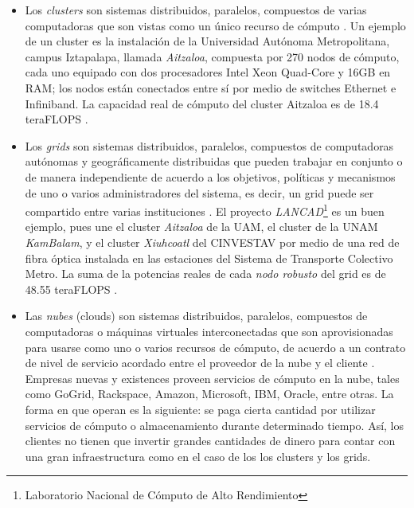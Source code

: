 \documentclass[letterpaper, 12pt]{report}
\begin{document}
\begin{itemize}
\item Los \emph{clusters} son sistemas distribuidos, paralelos, compuestos de varias computadoras que son vistas como un único recurso de cómputo \cite{buyya2009cloud}. Un ejemplo de un cluster es la instalación de la Universidad Autónoma Metropolitana, campus Iztapalapa, llamada \emph{Aitzaloa}, compuesta por 270 nodos de cómputo, cada uno equipado con dos procesadores Intel Xeon Quad-Core y 16GB en RAM; los nodos están conectados entre sí por medio de switches Ethernet e Infiniband. La capacidad real de cómputo del cluster Aitzaloa es de 18.4 teraFLOPS \cite{uamz2013tizaloa}.

\item Los \emph{grids} son sistemas distribuidos, paralelos, compuestos de computadoras autónomas y geográficamente distribuidas que pueden trabajar en conjunto o de manera independiente de acuerdo a los objetivos, políticas y mecanismos de uno o varios administradores del sistema, es decir, un grid puede ser compartido entre varias instituciones \cite{buyya2009cloud}. El proyecto \emph{LANCAD}\footnote{Laboratorio Nacional de Cómputo de Alto Rendimiento} es un buen ejemplo, pues une el cluster \emph{Aitzaloa} de la UAM, el cluster de la UNAM \emph{KamBalam}, y el cluster \emph{Xiuhcoatl} del CINVESTAV por medio de una red de fibra óptica instalada en las estaciones del Sistema de Transporte Colectivo Metro. La suma de la potencias reales de cada \emph{nodo robusto} del grid es de 48.55 teraFLOPS \cite{lancad2013xiuhcoatl}.

\item Las \emph{nubes} (clouds) son sistemas distribuidos, paralelos, compuestos de computadoras o máquinas virtuales interconectadas que son aprovisionadas para usarse como uno o varios recursos de cómputo, de acuerdo a un contrato de nivel de servicio acordado entre el proveedor de la nube y el cliente \cite{buyya2009cloud}. Empresas nuevas y existences proveen servicios de cómputo en la nube, tales como GoGrid, Rackspace, Amazon, Microsoft, IBM, Oracle, entre otras. La forma en que operan es la siguiente: se paga cierta cantidad por utilizar servicios de cómputo o almacenamiento durante determinado tiempo. Así, los clientes no tienen que invertir grandes cantidades de dinero para contar con una gran infraestructura como en el caso de los los clusters y los grids.
\end{itemize}
\end{document}
